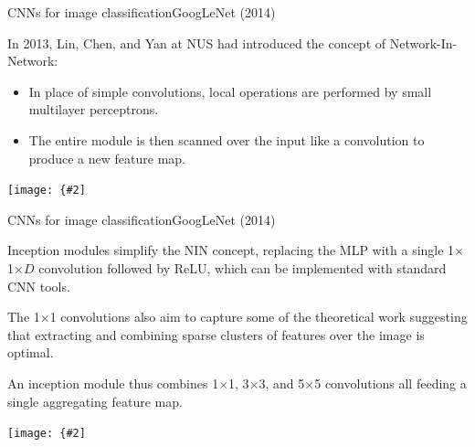 \documentclass{beamer}
\newcommand{\myfig}[3]{\centerline{\texttt{[image: \{\#2]}}}
\begin{document}
\begin{frame}{CNNs for image classification}{GoogLeNet (2014)}

  In 2013, Lin, Chen, and Yan at NUS had introduced the concept of
  Network-In-Network:
  \begin{itemize}
  \item In place of simple convolutions, local operations are
    performed by small multilayer perceptrons.
  \item The entire module is then scanned over the input like a
    convolution to produce a new feature map.
  \end{itemize}
    
  \medskip
  
  \myfig{3in}{lin-fig1}{Lin, Chen, and Yan (2013), Fig.\ 1}
  
\end{frame}


\begin{frame}{CNNs for image classification}{GoogLeNet (2014)}

  Inception modules simplify the NIN concept, replacing the MLP with a
  single 1$\times$1$\times D$ convolution followed by ReLU, which can
  be implemented with standard CNN tools.
  
  \medskip

  The 1$\times$1 convolutions also aim to capture some of the
  theoretical work suggesting that extracting and combining sparse
  clusters of features over the image is optimal.
  
  \medskip

  An inception module thus combines 1$\times$1, 3$\times$3, and
  5$\times$5 convolutions all feeding a single aggregating feature
  map.

  \medskip

  \myfig{3in}{szegedy-fig2}{Szegedy et al.\ (2014), Fig.\ 2}
  
\end{frame}
\end{document}
